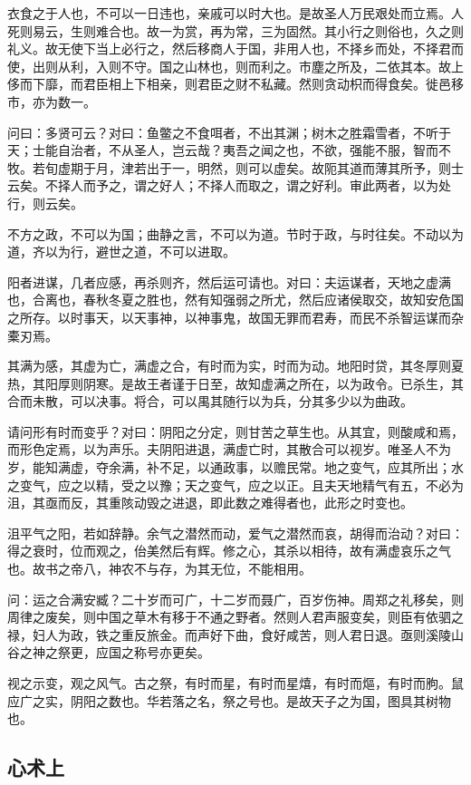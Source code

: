 \documentclass[]{article}
\begin{document}
衣食之于人也，不可以一日违也，亲戚可以时大也。是故圣人万民艰处而立焉。人死则易云，生则难合也。故一为赏，再为常，三为固然。其小行之则俗也，久之则礼义。故无使下当上必行之，然后移商人于国，非用人也，不择乡而处，不择君而使，出则从利，入则不守。国之山林也，则而利之。市塵之所及，二依其本。故上侈而下靡，而君臣相上下相亲，则君臣之财不私藏。然则贪动枳而得食矣。徙邑移市，亦为数一。

问曰：多贤可云？对曰：鱼鳖之不食咡者，不出其渊；树木之胜霜雪者，不听于天；士能自治者，不从圣人，岂云哉？夷吾之闻之也，不欲，强能不服，智而不牧。若旬虚期于月，津若出于一，明然，则可以虚矣。故阨其道而薄其所予，则士云矣。不择人而予之，谓之好人；不择人而取之，谓之好利。审此两者，以为处行，则云矣。

不方之政，不可以为国；曲静之言，不可以为道。节时于政，与时往矣。不动以为道，齐以为行，避世之道，不可以进取。

阳者进谋，几者应感，再杀则齐，然后运可请也。对曰：夫运谋者，天地之虚满也，合离也，春秋冬夏之胜也，然有知强弱之所尤，然后应诸侯取交，故知安危国之所存。以时事天，以天事神，以神事鬼，故国无罪而君寿，而民不杀智运谋而杂橐刃焉。

其满为感，其虚为亡，满虚之合，有时而为实，时而为动。地阳时贷，其冬厚则夏热，其阳厚则阴寒。是故王者谨于日至，故知虚满之所在，以为政令。已杀生，其合而未散，可以决事。将合，可以禺其随行以为兵，分其多少以为曲政。

请问形有时而变乎？对曰：阴阳之分定，则甘苦之草生也。从其宜，则酸咸和焉，而形色定焉，以为声乐。夫阴阳进退，满虚亡时，其散合可以视岁。唯圣人不为岁，能知满虚，夺余满，补不足，以通政事，以赡民常。地之变气，应其所出；水之变气，应之以精，受之以豫；天之变气，应之以正。且夫天地精气有五，不必为沮，其亟而反，其重陔动毁之进退，即此数之难得者也，此形之时变也。

沮平气之阳，若如辞静。余气之潜然而动，爱气之潜然而哀，胡得而治动？对曰：得之衰时，位而观之，佁美然后有辉。修之心，其杀以相待，故有满虚哀乐之气也。故书之帝八，神农不与存，为其无位，不能相用。

问：运之合满安臧？二十岁而可广，十二岁而聂广，百岁伤神。周郑之礼移矣，则周律之废矣，则中国之草木有移于不通之野者。然则人君声服变矣，则臣有依驷之禄，妇人为政，铁之重反旅金。而声好下曲，食好咸苦，则人君日退。亟则溪陵山谷之神之祭更，应国之称号亦更矣。

视之示变，观之风气。古之祭，有时而星，有时而星熺，有时而熰，有时而朐。鼠应广之实，阴阳之数也。华若落之名，祭之号也。是故天子之为国，图具其树物也。

\hypertarget{header-n503}{%
\subsection{心术上}\label{header-n503}}
\end{document}
